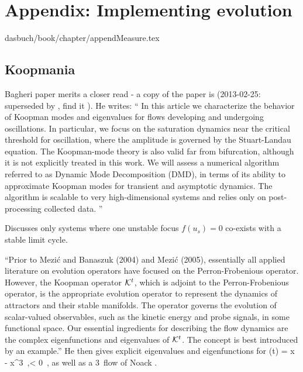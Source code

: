 \section{Appendix: Implementing evolution}
\label{c-appendMeasure}\noindent dasbuch/book/chapter/appendMeasure.tex
\begin{description}

\subsection{Koopmania}

\item[2012-09-01 PC]							\toCB
Bagheri paper merits a closer read - a copy of the paper is
(2013-02-25: superseded by , find it
). He writes:
``
In this article we characterize the behavior of Koopman modes and
eigenvalues for flows developing and undergoing oscillations. In
particular, we focus on the saturation dynamics near the critical
threshold for oscillation, where the amplitude is governed by the
Stuart-Landau equation. The Koopman-mode theory is also valid far from
bifurcation, although it is not explicitly treated in this work. We will
assess a numerical algorithm referred to as Dynamic Mode Decomposition
(DMD), in terms of its ability to approximate Koopman modes for transient
and asymptotic dynamics. The algorithm is scalable to very
high-dimensional systems and relies only on post-processing collected
data.
''

Discusses only systems where one
unstable focus $f (u_s) = 0$ co-exists with a stable limit cycle.

``Prior to Mezi\'c and Banaszuk (2004) and Mezi\'c (2005), essentially
all applied literature on evolution operators have focused on the
Perron-Frobenious operator. However, the Koopman operator ${\cal K}^t$, which is
adjoint to the Perron-Frobenious operator, is the appropriate evolution
operator to represent the dynamics of attractors and their stable
manifolds. The operator governs the evolution of scalar-valued
observables, such as the kinetic energy and probe signals, in some
functional space. Our essential ingredients for describing the flow
dynamics are the complex eigenfunctions and eigenvalues of ${\cal K}^t$. The
concept is best introduced by an example.'' He then gives explicit
eigenvalues and eigenfunctions for
\beq
{}(t) = \mu x - x^3 \,,\qquad \mu  < 0
\,,
as well as a 3\dmn\ flow of Noack \etal.


\end{description}
